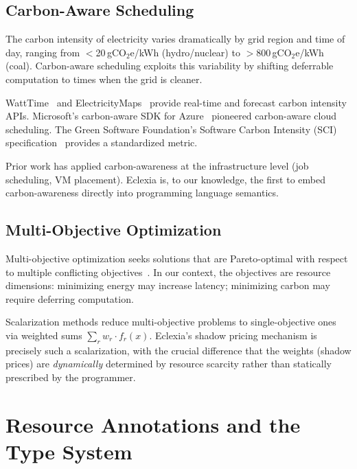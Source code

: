\documentclass[11pt,a4paper]{article}
\begin{document}
\subsection{Carbon-Aware Scheduling}

The carbon intensity of electricity varies dramatically by grid region and time
of day, ranging from $<$20\,gCO$_2$e/kWh (hydro/nuclear) to
$>$800\,gCO$_2$e/kWh (coal).  Carbon-aware scheduling exploits this
variability by shifting deferrable computation to times when the grid is
cleaner.

WattTime~\cite{watttime} and ElectricityMaps~\cite{electricitymaps} provide
real-time and forecast carbon intensity APIs.  Microsoft's carbon-aware SDK
for Azure~\cite{microsoft_carbon_sdk} pioneered carbon-aware cloud scheduling.
The Green Software Foundation's Software Carbon Intensity (SCI)
specification~\cite{gsf_sci} provides a standardized metric.

Prior work has applied carbon-awareness at the infrastructure level (job
scheduling, VM placement).  Eclexia is, to our knowledge, the first to embed
carbon-awareness directly into programming language semantics.

\subsection{Multi-Objective Optimization}

Multi-objective optimization seeks solutions that are Pareto-optimal with
respect to multiple conflicting objectives~\cite{ehrgott2005}.  In our context,
the objectives are resource dimensions: minimizing energy may increase latency;
minimizing carbon may require deferring computation.

Scalarization methods reduce multi-objective problems to single-objective ones
via weighted sums $\sum_r w_r \cdot f_r(x)$.  Eclexia's shadow pricing
mechanism is precisely such a scalarization, with the crucial difference that
the weights (shadow prices) are \emph{dynamically} determined by resource
scarcity rather than statically prescribed by the programmer.


\section{Resource Annotations and the Type System}
\label{sec:type-system}
\end{document}
